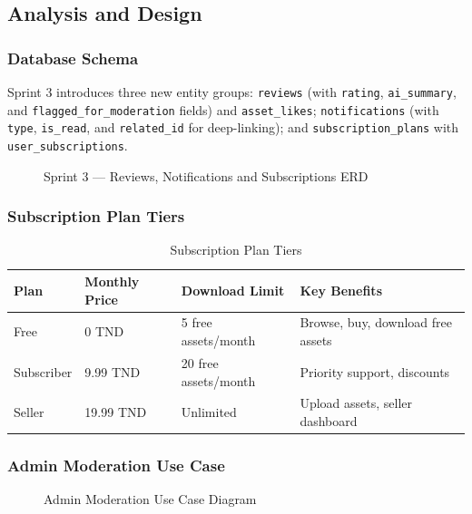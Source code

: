 \subsection{Analysis and Design}

\subsubsection{Database Schema}

Sprint 3 introduces three new entity groups: \texttt{reviews} (with \texttt{rating}, \texttt{ai\_summary}, and \texttt{flagged\_for\_moderation} fields) and \texttt{asset\_likes}; \texttt{notifications} (with \texttt{type}, \texttt{is\_read}, and \texttt{related\_id} for deep-linking); and \texttt{subscription\_plans} with \texttt{user\_subscriptions}.

\begin{figure}[H]
\centering
\resizebox{\textwidth}{!}{}
\caption{Sprint 3 --- Reviews, Notifications and Subscriptions ERD}
\label{fig:sprint3_erd}
\end{figure}

\subsubsection{Subscription Plan Tiers}

\begin{table}[H]
\centering
\caption{Subscription Plan Tiers}
\begin{tabular}{L{3cm} C{3cm} C{3cm} C{4cm}}
\toprule
\textbf{Plan} & \textbf{Monthly Price} & \textbf{Download Limit} & \textbf{Key Benefits} \\
\midrule
Free       & 0 TND    & 5 free assets/month  & Browse, buy, download free assets \\
Subscriber & 9.99 TND & 20 free assets/month & Priority support, discounts \\
Seller     & 19.99 TND & Unlimited            & Upload assets, seller dashboard \\
\bottomrule
\end{tabular}
\end{table}

\subsubsection{Admin Moderation Use Case}

\begin{figure}[H]
\centering
\resizebox{0.9\textwidth}{!}{}
\caption{Admin Moderation Use Case Diagram}
\label{fig:sprint3_admin_uc}
\end{figure}

